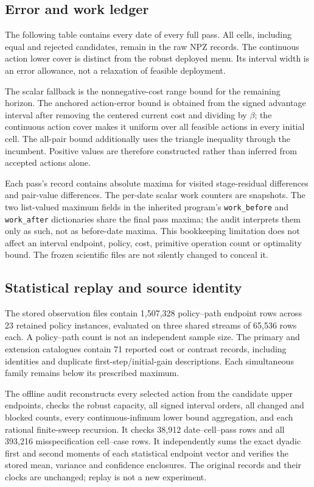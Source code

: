 \subsection{Error and work ledger}
The following table contains every date of every full pass. All cells, including equal and rejected candidates, remain in the raw NPZ records. The continuous action lower cover is distinct from the robust deployed menu. Its interval width is an error allowance, not a relaxation of feasible deployment.



The scalar fallback is the nonnegative-cost range bound for the remaining horizon. The anchored action-error bound is obtained from the signed advantage interval after removing the centered current cost and dividing by $\beta$; the continuous action cover makes it uniform over all feasible actions in every initial cell. The all-pair bound additionally uses the triangle inequality through the incumbent. Positive values are therefore constructed rather than inferred from accepted actions alone.

Each pass's record contains absolute maxima for visited stage-residual differences and pair-value differences. The per-date scalar work counters are snapshots. The two list-valued maximum fields in the inherited program's \texttt{work\_before} and \texttt{work\_after} dictionaries share the final pass maxima; the audit interprets them only as such, not as before-date maxima. This bookkeeping limitation does not affect an interval endpoint, policy, cost, primitive operation count or optimality bound. The frozen scientific files are not silently changed to conceal it.

\subsection{Statistical replay and source identity}
The stored observation files contain 1,507,328 policy--path endpoint rows across 23 retained policy instances, evaluated on three shared streams of 65,536 rows each. A policy--path count is not an independent sample size. The primary and extension catalogues contain 71 reported cost or contrast records, including identities and duplicate first-step/initial-gain descriptions. Each simultaneous family remains below its prescribed maximum.

The offline audit reconstructs every selected action from the candidate upper endpoints, checks the robust capacity, all signed interval orders, all changed and blocked counts, every continuous-infimum lower bound aggregation, and each rational finite-sweep recursion. It checks 38,912 date--cell--pass rows and all 393,216 misspecification cell--case rows. It independently sums the exact dyadic first and second moments of each statistical endpoint vector and verifies the stored mean, variance and confidence enclosures. The original records and their clocks are unchanged; replay is not a new experiment.

